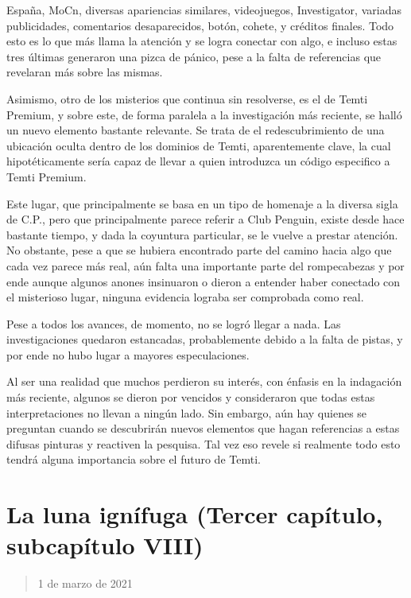 \documentclass[
  spanish,
]{book}
\begin{document}
España, MoCn, diversas apariencias similares, videojuegos, Investigator, variadas publicidades, comentarios desaparecidos, botón, cohete, y créditos finales. Todo esto es lo que más llama la atención y se logra conectar con algo, e incluso estas tres últimas generaron una pizca de pánico, pese a la falta de referencias que revelaran más sobre las mismas.

Asimismo, otro de los misterios que continua sin resolverse, es el de Temti Premium, y sobre este, de forma paralela a la investigación más reciente, se halló un nuevo elemento bastante relevante. Se trata de el redescubrimiento de una ubicación oculta dentro de los dominios de Temti, aparentemente clave, la cual hipotéticamente sería capaz de llevar a quien introduzca un código especifico a Temti Premium.

Este lugar, que principalmente se basa en un tipo de homenaje a la diversa sigla de C.P., pero que principalmente parece referir a Club Penguin, existe desde hace bastante tiempo, y dada la coyuntura particular, se le vuelve a prestar atención. No obstante, pese a que se hubiera encontrado parte del camino hacia algo que cada vez parece más real, aún falta una importante parte del rompecabezas y por ende aunque algunos anones insinuaron o dieron a entender haber conectado con el misterioso lugar, ninguna evidencia lograba ser comprobada como real.

Pese a todos los avances, de momento, no se logró llegar a nada. Las investigaciones quedaron estancadas, probablemente debido a la falta de pistas, y por ende no hubo lugar a mayores especulaciones.

Al ser una realidad que muchos perdieron su interés, con énfasis en la indagación más reciente, algunos se dieron por vencidos y consideraron que todas estas interpretaciones no llevan a ningún lado. Sin embargo, aún hay quienes se preguntan cuando se descubrirán nuevos elementos que hagan referencias a estas difusas pinturas y reactiven la pesquisa. Tal vez eso revele si realmente todo esto tendrá alguna importancia sobre el futuro de Temti.

\hypertarget{la-luna-ignuxedfuga-tercer-capuxedtulo-subcapuxedtulo-viii}{%
\section{La luna ignífuga (Tercer capítulo, subcapítulo VIII)}\label{la-luna-ignuxedfuga-tercer-capuxedtulo-subcapuxedtulo-viii}}

\begin{quote}
1 de marzo de 2021
\end{quote}
\end{document}
